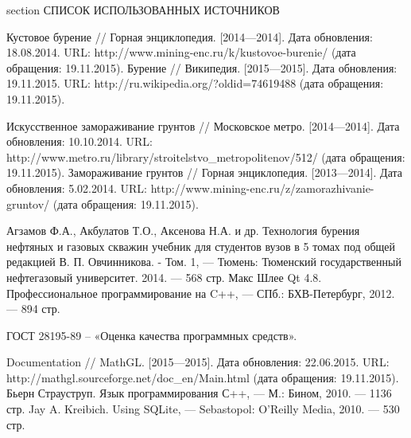 \newpage
{} {section} {СПИСОК ИСПОЛЬЗОВАННЫХ ИСТОЧНИКОВ}

\begin{thebibliography}{99}
   Кустовое бурение // Горная энциклопедия. [2014—2014]. Дата обновления: 18.08.2014. URL: http://www.mining-enc.ru/k/kustovoe-burenie/ (дата обращения: 19.11.2015).
   Бурение // Википедия. [2015—2015]. Дата обновления: 19.11.2015. URL: http://ru.wikipedia.org/?oldid=74619488 (дата обращения: 19.11.2015).
  
   Искусственное замораживание грунтов // Московское метро. [2014—2014]. Дата обновления: 10.10.2014. URL: http://www.metro.ru/library/stroitelstvo\_metropolitenov/512/ (дата обращения: 19.11.2015).
   Замораживание грунтов // Горная энциклопедия. [2013—2014]. Дата обновления: 5.02.2014. URL: http://www.mining-enc.ru/z/zamorazhivanie-gruntov/ (дата обращения: 19.11.2015).


   Агзамов Ф.А., Акбулатов Т.О., Аксенова Н.А. и др. Технология бурения нефтяных и газовых скважин учебник для студентов вузов в 5 томах
    под общей редакцией В. П. Овчинникова. - Том. 1, — Тюмень: Тюменский государственный нефтегазовый университет. 2014. — 568 стр.
   Макс Шлее Qt 4.8. Профессиональное программирование на C++, — СПб.: БХВ-Петербург, 2012. — 894 стр.

   ГОСТ 28195-89 – «Оценка качества программных средств».


   Documentation // MathGL. [2015—2015]. Дата обновления: 22.06.2015. URL: http://mathgl.sourceforge.net/doc\_en/Main.html (дата обращения: 19.11.2015).
   Бьерн Страуструп. Язык программирования С++, — М.: Бином, 2010. — 1136 стр.
   Jay A. Kreibich. Using SQLite, — Sebastopol: O’Reilly Media, 2010. — 530 стр.
\end{thebibliography}

